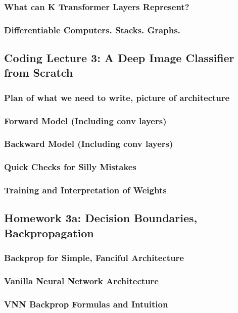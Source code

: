 \documentclass[12pt]{article}
\begin{document}
      \subsubsection*{What can K Transformer Layers Represent?}
      \subsubsection*{Differentiable Computers.  Stacks.  Graphs.}
    \newpage

    \subsection*{Coding Lecture 3: A Deep Image Classifier from Scratch}
      \subsubsection*{Plan of what we need to write, picture of architecture}
      \subsubsection*{Forward Model (Including conv layers)}
      \subsubsection*{Backward Model (Including conv layers)}
      \subsubsection*{Quick Checks for Silly Mistakes}
      \subsubsection*{Training and Interpretation of Weights}
    \newpage

    \subsection*{Homework 3a: Decision Boundaries, Backpropagation}
      \subsubsection*{Backprop for Simple, Fanciful Architecture}
      \subsubsection*{Vanilla Neural Network Architecture}
      \subsubsection*{VNN Backprop Formulas and Intuition}
\end{document}

